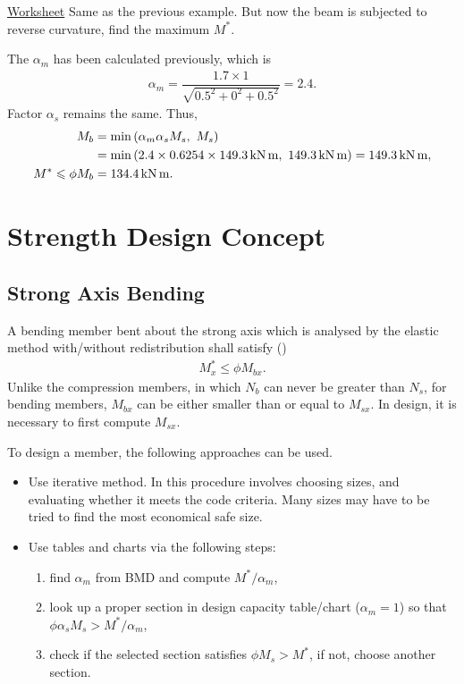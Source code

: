 \begin{exmp}\href{run:./WORKSHEET/CH05/EX5.BSSB.sm}{Worksheet}
Same as the previous example. But now the beam is subjected to reverse curvature, find the maximum $M^*$.
\end{exmp}
\begin{solution}
The $\alpha_m$ has been calculated previously, which is
\begin{gather*}
\alpha_m=\dfrac{1.7\times1}{\sqrt{0.5^2+0^2+0.5^2}}=2.4.
\end{gather*}
Factor $\alpha_s$ remains the same. Thus,
\begin{align*}
M_b&=\min\left(\alpha_m\alpha_sM_s,~M_s\right)\\&=\min\left(2.4\times0.6254\times\SI{149.3}{\kilo\newton\meter},~\SI{149.3}{\kilo\newton\meter}\right)=\SI{149.3}{\kilo\newton\meter},\\
M^*\leqslant\phi{}M_b&=\SI{134.4}{\kilo\newton\meter}.
\end{align*}
\end{solution}
\section{Strength Design Concept}
\subsection{Strong Axis Bending}
A bending member bent about the strong axis which is analysed by the elastic method with/without redistribution shall satisfy ()
\begin{gather}
M^*_x\leqslant\phi{}M_{bx}.
\end{gather}
Unlike the compression members, in which $N_b$ can never be greater than $N_s$, for bending members, $M_{bx}$ can be either smaller than or equal to $M_{sx}$. In design, it is necessary to first compute $M_{sx}$.

To design a member, the following approaches can be used.
\begin{itemize}
\item Use iterative method. In this procedure involves choosing sizes, and evaluating whether it meets the code criteria. Many sizes may have to be tried to find the most economical safe size.
\item Use tables and charts via the following steps:
\begin{enumerate}
\item find $\alpha_m$ from BMD and compute $M^*/\alpha_m$,
\item look up a proper section in design capacity table/chart ($\alpha_m=1$) so that $\phi{}\alpha_sM_s>M^*/\alpha_m$,
\begin{figure}[H]
\centering

\end{figure}
\item check if the selected section satisfies $\phi{}M_s>M^*$, if not, choose another section.
\end{enumerate}
\end{itemize}

